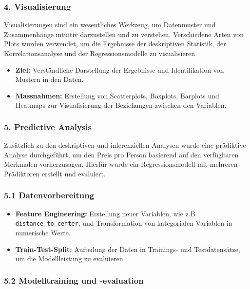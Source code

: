 \documentclass[
  journal,
]{IEEEtran}%
\begin{document}
\subsubsection{\texorpdfstring{4.
\textbf{Visualisierung}}{4. Visualisierung}}\label{visualisierung}

Visualisierungen sind ein wesentliches Werkzeug, um Datenmuster und
Zusammenhänge intuitiv darzustellen und zu verstehen. Verschiedene Arten
von Plots wurden verwendet, um die Ergebnisse der deskriptiven
Statistik, der Korrelationsanalyse und der Regressionsmodelle zu
visualisieren.

\begin{itemize}
\item
  \textbf{Ziel:} Verständliche Darstellung der Ergebnisse und
  Identifikation von Mustern in den Daten.
\item
  \textbf{Massnahmen:} Erstellung von Scatterplots, Boxplots, Barplots
  und Heatmaps zur Visualisierung der Beziehungen zwischen den
  Variablen.
\end{itemize}

\subsubsection{5. Predictive Analysis}\label{predictive-analysis}

Zusätzlich zu den deskriptiven und inferenziellen Analysen wurde eine
prädiktive Analyse durchgeführt, um den Preis pro Person basierend auf
den verfügbaren Merkmalen vorherzusagen. Hierfür wurde ein
Regressionsmodell mit mehreren Prädiktoren erstellt und evaluiert.

\subsubsection{5.1 Datenvorbereitung}\label{datenvorbereitung}

\begin{itemize}
\item
  \textbf{Feature Engineering:} Erstellung neuer Variablen, wie z.B.
  \texttt{distance\_to\_center}, und Transformation von kategorialen
  Variablen in numerische Werte.
\item
  \textbf{Train-Test-Split:} Aufteilung der Daten in Trainings- und
  Testdatensätze, um die Modellleistung zu evaluieren.
\end{itemize}

\subsubsection{5.2 Modelltraining und
-evaluation}\label{modelltraining-und--evaluation}
\end{document}
